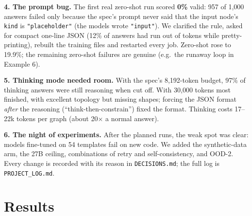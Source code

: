 \documentclass[11pt,a4paper]{article}
\begin{document}
\noindent\textbf{4. The prompt bug.} The first real zero-shot run scored \textbf{0\%} valid: 957 of 1{,}000 answers
failed only because the spec's prompt never said that the input node's \texttt{kind} is \texttt{"placeholder"} (the models
wrote \texttt{"input"}). We clarified the rule, asked for compact one-line JSON (12\% of answers had run out of tokens
while pretty-printing), rebuilt the training files and restarted every job. Zero-shot rose to 19.9\%; the remaining
zero-shot failures are genuine (e.g.\ the runaway loop in Example 6).

\noindent\textbf{5. Thinking mode needed room.} With the spec's 8{,}192-token budget, 97\% of thinking answers were
still reasoning when cut off. With 30{,}000 tokens most finished, with excellent topology but missing shapes; forcing
the JSON format \emph{after} the reasoning (``think-then-constrain'') fixed the format. Thinking costs 17--22k tokens per
graph (about 20$\times$ a normal answer).

\noindent\textbf{6. The night of experiments.} After the planned runs, the weak spot was clear: models fine-tuned on 54
templates fail on new code. We added the synthetic-data arm, the 27B ceiling, combinations of retry and
self-consistency, and OOD-2. Every change is recorded with its reason in \texttt{DECISIONS.md}; the full log is
\texttt{PROJECT\_LOG.md}.

\section{Results}\label{sec:results}
\end{document}
